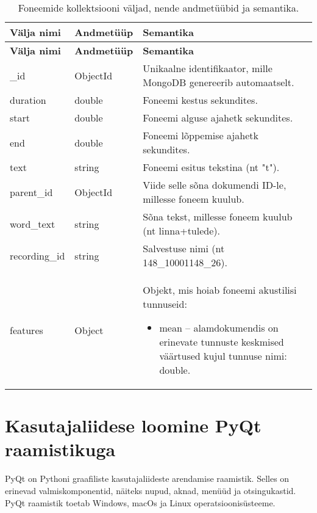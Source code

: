 \begin{longtable}{|p{2.5cm}|p{3cm}|p{8cm}|}
    \caption{Foneemide kollektsiooni väljad, nende andmetüübid ja semantika.}
    \label{tab:phonemes}\\
    \hline
    \textbf{Välja nimi} & \textbf{Andmetüüp} & \textbf{Semantika}\\
    \hline
    \endfirsthead
    \hline
    \textbf{Välja nimi} & \textbf{Andmetüüp} & \textbf{Semantika}\\
    \hline
    \endhead
    \endfoot
    \hline
    \endlastfoot

    \_id &
    ObjectId &
    Unikaalne identifikaator, mille MongoDB genereerib automaatselt.\\ \hline

    duration &
    double &
    Foneemi kestus sekundites.\\ \hline

    start &
    double &
    Foneemi alguse ajahetk sekundites.\\ \hline

    end &
    double &
    Foneemi lõppemise ajahetk sekundites.\\ \hline

    text &
    string &
    Foneemi esitus tekstina (nt "t").\\ \hline

    parent\_id &
    ObjectId &
    Viide selle sõna dokumendi ID-le, millesse foneem kuulub.\\ \hline
    
    word\_text &
    string &
    Sõna tekst, millesse foneem kuulub (nt linna+tulede).\\ \hline

    recording\_id &
    string &
    Salvestuse nimi (nt 148\_10001148\_26).\\ \hline

    features &
    Object &
    Objekt, mis hoiab foneemi akustilisi tunnuseid:
    \begin{itemize}
      \item mean – alamdokumendis on erinevate tunnuste keskmised väärtused kujul tunnuse nimi: double.
    \end{itemize}\\ \hline
\end{longtable}

\section{Kasutajaliidese loomine PyQt raamistikuga}
PyQt \cite{pyqt5} on Pythoni graafiliste kasutajaliideste arendamise raamistik. Selles on erinevad valmiskomponentid, näiteks nupud, aknad, menüüd ja otsingukastid. PyQt raamistik toetab Windows, macOs ja Linux operatsioonisüsteeme.

